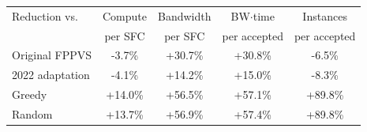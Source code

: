 \begin{tabular}{lcccc}
\toprule
Reduction vs. & Compute & Bandwidth & BW$\cdot$time & Instances \\
 & per SFC & per SFC & per accepted & per accepted \\
\midrule
Original FPPVS & -3.7\% & +30.7\% & +30.8\% & -6.5\% \\
2022 adaptation & -4.1\% & +14.2\% & +15.0\% & -8.3\% \\
Greedy & +14.0\% & +56.5\% & +57.1\% & +89.8\% \\
Random & +13.7\% & +56.9\% & +57.4\% & +89.8\% \\
\bottomrule
\end{tabular}
